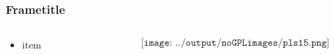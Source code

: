 \documentclass[aspectratio=169,xcolor=dvipsnames]{beamer}
\begin{document}
\begin{frame}
	\frametitle{Frametitle}
	\begin{columns}
		\begin{column}{0.5\textwidth}
			\begin{itemize}
				\item item
			\end{itemize}

			
		\end{column}

		\begin{column}{0.5\textwidth}
	$$\texttt{[image: ../output/noGPLimages/pls15.png]}$$
		\end{column}
	\end{columns}
\end{frame}
\end{document}
